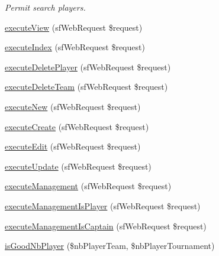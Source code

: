 \begin{DoxyCompactItemize}
\begin{DoxyCompactList}\small\item\em Permit search players. \end{DoxyCompactList}\item 
\hyperlink{classteam_actions_ad61d212fa3f7e8cb4190700a8a670606}{execute\-View} (sf\-Web\-Request \$request)
\item 
\hyperlink{classteam_actions_a948cc911eb1d9f77990be54af3b2080f}{execute\-Index} (sf\-Web\-Request \$request)
\item 
\hyperlink{classteam_actions_af819d9fd9764e19df0b987e29364f5f3}{execute\-Delete\-Player} (sf\-Web\-Request \$request)
\item 
\hyperlink{classteam_actions_ab50f30ef5956b4584470b35fee824e01}{execute\-Delete\-Team} (sf\-Web\-Request \$request)
\item 
\hyperlink{classteam_actions_a0ffbea56560c6c633dae68ec22aff21c}{execute\-New} (sf\-Web\-Request \$request)
\item 
\hyperlink{classteam_actions_a75837617743fb64dca82d8133b2c662a}{execute\-Create} (sf\-Web\-Request \$request)
\item 
\hyperlink{classteam_actions_af4d8fedd4b28f3398826a1bb8fa54394}{execute\-Edit} (sf\-Web\-Request \$request)
\item 
\hyperlink{classteam_actions_af7b4f51862add3c2ebb54efc136a0840}{execute\-Update} (sf\-Web\-Request \$request)
\item 
\hyperlink{classteam_actions_aca414aa4c81e3b136469a6be84448b3e}{execute\-Management} (sf\-Web\-Request \$request)
\item 
\hyperlink{classteam_actions_a729c5ed748769c37bdb572e307a72717}{execute\-Management\-Is\-Player} (sf\-Web\-Request \$request)
\item 
\hyperlink{classteam_actions_ab67eb7bc75a23fb98286974726326b39}{execute\-Management\-Is\-Captain} (sf\-Web\-Request \$request)
\item 
\hyperlink{classteam_actions_ac86580b2e0573a0a4065fa3740a56527}{is\-Good\-Nb\-Player} (\$nb\-Player\-Team, \$nb\-Player\-Tournament)
\end{DoxyCompactItemize}
